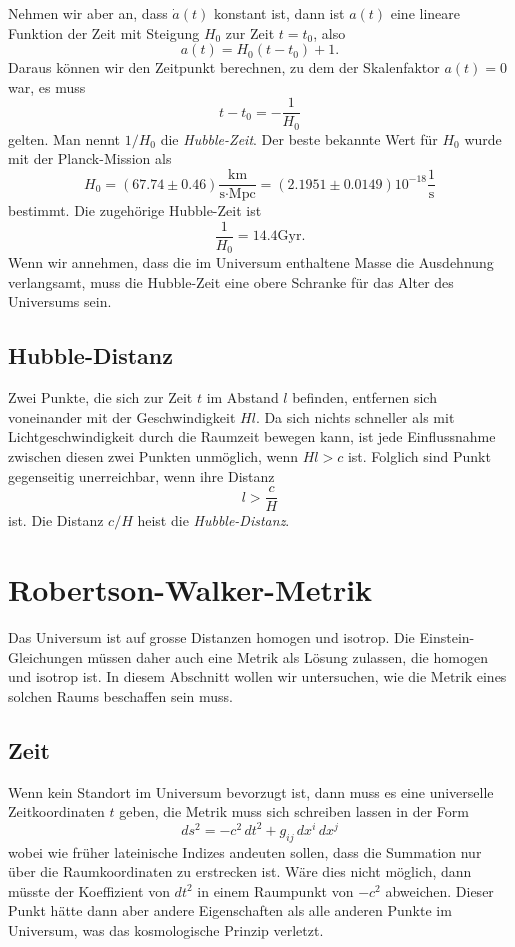 Nehmen wir aber an, dass $\dot a(t)$ konstant ist, dann ist $a(t)$
eine lineare Funktion der Zeit mit Steigung  $H_0$ zur Zeit $t=t_0$,
also
\[
a(t)=H_0(t-t_0) + 1.
\]
Daraus können wir den Zeitpunkt berechnen, zu dem der Skalenfaktor
$a(t)=0$ war, es muss
\[
t-t_0 = -\frac1{H_0}
\]
gelten.
Man nennt $1/H_0$ die {\em Hubble-Zeit}.
Der beste bekannte Wert für $H_0$ wurde mit der Planck-Mission als
\begin{equation}
H_0
=
(67.74 \pm 0.46)\frac{\text{km}}{\text{s}\cdot\text{Mpc}}
=
(2.1951\pm 0.0149)
10^{-18}\frac{1}{\text{s}}
\label{skript:robertson:hubble0}
\end{equation}
bestimmt.
Die zugehörige Hubble-Zeit ist
\begin{equation}
\frac{1}{H_0} = 14.4\text{Gyr}.
\label{skript:robertson:hubblezeit}
\end{equation}
Wenn wir annehmen, dass die im Universum enthaltene Masse die Ausdehnung
verlangsamt, muss die Hubble-Zeit eine obere Schranke für das Alter
des Universums sein.

\subsection{Hubble-Distanz%
\label{skript:section:hubble-distanz}}
Zwei Punkte, die sich zur Zeit $t$ im Abstand $l$ befinden, entfernen
sich voneinander mit der Geschwindigkeit $Hl$. 
Da sich nichts schneller als mit Lichtgeschwindigkeit durch die
Raumzeit bewegen kann, ist jede Einflussnahme zwischen diesen zwei
Punkten unmöglich, wenn $Hl>c$ ist.
Folglich sind Punkt gegenseitig unerreichbar, wenn ihre Distanz
\begin{equation}
l > \frac{c}{H}
\label{skript:robertson:hubbledistanz}
\end{equation}
ist.
Die Distanz $c/H$ heist die {\em Hubble-Distanz}.
%

\section{Robertson-Walker-Metrik}
Das Universum ist auf grosse Distanzen homogen und isotrop.
Die Einstein-Gleichungen müssen daher auch eine Metrik als
Lösung zulassen, die homogen und isotrop ist.
In diesem Abschnitt wollen wir untersuchen, wie die Metrik eines
solchen Raums beschaffen sein muss.

\subsection{Zeit}
Wenn kein Standort im Universum bevorzugt ist, dann muss es
eine universelle Zeitkoordinaten $t$ geben, die Metrik muss
sich schreiben lassen in der Form
\[
ds^2
=
-c^2\,dt^2
+
g_{ij}\,dx^i\,dx^j
\]
wobei wie früher lateinische Indizes andeuten sollen, dass die
Summation nur über die Raumkoordinaten zu erstrecken ist.
Wäre dies nicht möglich, dann müsste der Koeffizient von $dt^2$
in einem Raumpunkt von $-c^2$ abweichen.
Dieser Punkt hätte dann aber andere Eigenschaften als alle anderen
Punkte im Universum, was das kosmologische Prinzip verletzt.

